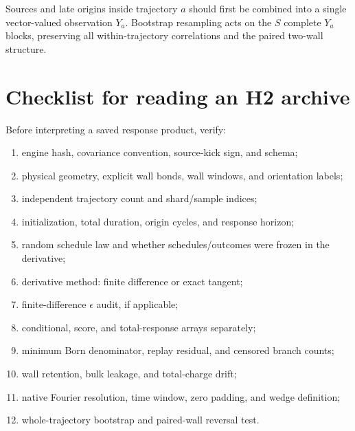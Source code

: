 \documentclass[aps,prb,onecolumn,nofootinbib,superscriptaddress]{revtex4-2}
\begin{document}
Sources and late origins inside trajectory $a$ should first be combined into a
single vector-valued observation $Y_a$.  Bootstrap resampling acts on the
$S$ complete $Y_a$ blocks, preserving all within-trajectory correlations and
the paired two-wall structure.

\section{Checklist for reading an H2 archive}
\label{app:archive-checklist}

Before interpreting a saved response product, verify:
\begin{enumerate}
  \item engine hash, covariance convention, source-kick sign, and schema;
  \item physical geometry, explicit wall bonds, wall windows, and orientation
  labels;
  \item independent trajectory count and shard/sample indices;
  \item initialization, total duration, origin cycles, and response horizon;
  \item random schedule law and whether schedules/outcomes were frozen in the
  derivative;
  \item derivative method: finite difference or exact tangent;
  \item finite-difference $\epsilon$ audit, if applicable;
  \item conditional, score, and total-response arrays separately;
  \item minimum Born denominator, replay residual, and censored branch counts;
  \item wall retention, bulk leakage, and total-charge drift;
  \item native Fourier resolution, time window, zero padding, and wedge
  definition;
  \item whole-trajectory bootstrap and paired-wall reversal test.
\end{enumerate}



\end{document}
